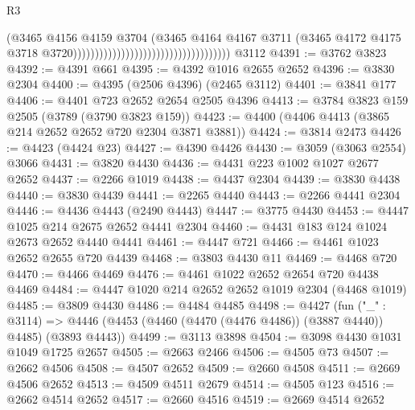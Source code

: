 \begin{lexlean}{R3}
\begin{coremodule}
                                                                      (@3465
                                                                        @4156
                                                                        @4159
                                                                        @3704
                                                                        (@3465
                                                                          @4164
                                                                          @4167
                                                                          @3711
                                                                          (@3465
                                                                            @4172
                                                                            @4175
                                                                            @3718
                                                                            @3720))))))))))))))))))))))))))))))))))))
    @3112
@4391 := @3762 @3823
@4392 := @4391 @661
@4395 := @4392 @1016 @2655 @2652
@4396 := @3830 @2304
@4400 := @4395 (@2506 @4396) (@2465 @3112)
@4401 := @3841 @177
@4406 := @4401 @723 @2652 @2654 @2505 @4396
@4413 := @3784 @3823 @159 @2505 (@3789 (@3790 @3823 @159))
@4423 := @4400 (@4406 @4413 (@3865 @214 @2652 @2652 @720 @2304 @3871 @3881))
@4424 := @3814 @2473
@4426 := @4423 (@4424 @23)
@4427 := @4390 @4426
@4430 := @3059 (@3063 @2554) @3066
@4431 := @3820 @4430
@4436 := @4431 @223 @1002 @1027 @2677 @2652
@4437 := @2266 @1019
@4438 := @4437 @2304
@4439 := @3830 @4438
@4440 := @3830 @4439
@4441 := @2265 @4440
@4443 := @2266 @4441 @2304
@4446 := @4436 @4443 (@2490 @4443)
@4447 := @3775 @4430
@4453 := @4447 @1025 @214 @2675 @2652 @4441 @2304
@4460 := @4431 @183 @124 @1024 @2673 @2652 @4440 @4441
@4461 := @4447 @721
@4466 := @4461 @1023 @2652 @2655 @720 @4439
@4468 := @3803 @4430 @11
@4469 := @4468 @720
@4470 := @4466 @4469
@4476 := @4461 @1022 @2652 @2654 @720 @4438 @4469
@4484 := @4447 @1020 @214 @2652 @2652 @1019 @2304 (@4468 @1019)
@4485 := @3809 @4430
@4486 := @4484 @4485
@4498 := @4427
    (fun ("_" : @3114) =>
    @4446 (@4453 (@4460 (@4470 (@4476 @4486)) (@3887 @4440)) @4485) (@3893 @4443))
@4499 := @3113 @3898
@4504 := @3098 @4430 @1031 @1049 @1725 @2657
@4505 := @2663 @2466
@4506 := @4505 @73
@4507 := @2662 @4506
@4508 := @4507 @2652
@4509 := @2660 @4508
@4511 := @2669 @4506 @2652
@4513 := @4509 @4511 @2679
@4514 := @4505 @123
@4516 := @2662 @4514 @2652
@4517 := @2660 @4516
@4519 := @2669 @4514 @2652

\end{coremodule}
\end{lexlean}
